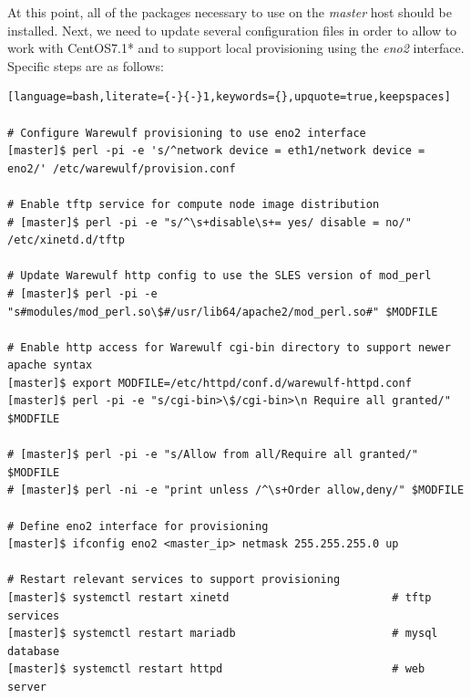 \documentclass[letterpaper]{article}
\newcommand{\baseOS}{CentOS7.1*}
\begin{document}
At this point, all of the packages necessary to use \Warewulf{} on the {\em
  master} host should be installed.  Next, we need to update several
configuration files in order to allow \Warewulf{} to work with \baseOS{} and to support
local provisioning using the {\em eno2} interface.  Specific steps are as
follows:


\begin{lstlisting}[language=bash,literate={-}{-}1,keywords={},upquote=true,keepspaces]

# Configure Warewulf provisioning to use eno2 interface
[master]$ perl -pi -e 's/^network device = eth1/network device = eno2/' /etc/warewulf/provision.conf

# Enable tftp service for compute node image distribution
# [master]$ perl -pi -e "s/^\s+disable\s+= yes/ disable = no/" /etc/xinetd.d/tftp

# Update Warewulf http config to use the SLES version of mod_perl
# [master]$ perl -pi -e "s#modules/mod_perl.so\$#/usr/lib64/apache2/mod_perl.so#" $MODFILE

# Enable http access for Warewulf cgi-bin directory to support newer apache syntax
[master]$ export MODFILE=/etc/httpd/conf.d/warewulf-httpd.conf
[master]$ perl -pi -e "s/cgi-bin>\$/cgi-bin>\n Require all granted/" $MODFILE

# [master]$ perl -pi -e "s/Allow from all/Require all granted/" $MODFILE
# [master]$ perl -ni -e "print unless /^\s+Order allow,deny/" $MODFILE

# Define eno2 interface for provisioning
[master]$ ifconfig eno2 <master_ip> netmask 255.255.255.0 up

# Restart relevant services to support provisioning
[master]$ systemctl restart xinetd                         # tftp services
[master]$ systemctl restart mariadb                        # mysql database
[master]$ systemctl restart httpd                          # web server
\end{lstlisting}
\end{document}
